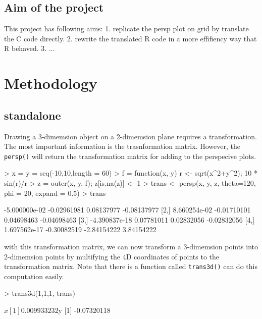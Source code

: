 \documentclass[a4paper,10pt]{article}
\begin{document}
\subsection{Aim of the project}
This project has following aims:
1. replicate the persp plot on grid by translate the C code directly.
2. rewrite the translated R code in a more effifiency way that R behaved.
3. ...

\section{Methodology}
\subsection{standalone}
Drawing a 3-dimemsion object on a 2-dimemsion plane requires a transformation. The most important information is the trasnformation matrix. However, the \texttt{persp()} will return the transformation matrix for adding to the perspecive plots.

\begin{Schunk}
\begin{Sinput}
> x = y = seq(-10,10,length = 60)
> f = function(x, y) { r <- sqrt(x^2+y^2); 10 * sin(r)/r }
> z = outer(x, y, f); z[is.na(z)] <- 1
> trans <- persp(x, y, z, theta=120, phi = 20, expand = 0.5)
> trans
\end{Sinput}
\end{Schunk}

\begin{Schunk}
\begin{Soutput}
              [,1]        [,2]        [,3]        [,4]
[1,] -5.000000e-02 -0.02961981  0.08137977 -0.08137977
[2,]  8.660254e-02 -0.01710101  0.04698463 -0.04698463
[3,] -4.390837e-18  0.07781011  0.02832056 -0.02832056
[4,]  1.697562e-17 -0.30082519 -2.84154222  3.84154222
\end{Soutput}
\end{Schunk}


with this transformation matrix, we can now transform a 3-dimemsion points into 2-dimemsion points by multifying the 4D coordinates  of points to the transformation matrix. Note that there is a function called \texttt{trans3d()} can do this computation easily.

\begin{Schunk}
\begin{Sinput}
> trans3d(1,1,1, trans)
\end{Sinput}
\begin{Soutput}
$x
[1] 0.009933232

$y
[1] -0.07320118
\end{Soutput}
\end{Schunk}
\end{document}
